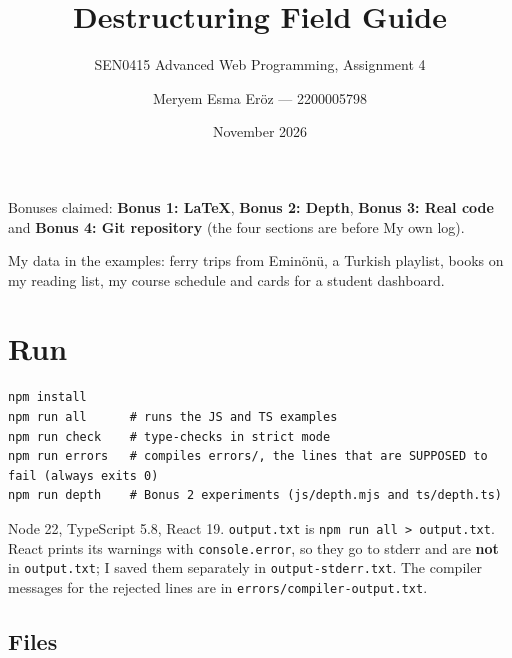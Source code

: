 \documentclass[
  10pt,
]{article}
\title{Destructuring Field Guide}
\subtitle{SEN0415 Advanced Web Programming, Assignment 4}
\author{Meryem Esma Eröz --- 2200005798}
\date{November 2026}
\begin{document}
\maketitle

\renewcommand*\contentsname{Contents}
{
\hypersetup{linkcolor=black}
\setcounter{tocdepth}{2}
\tableofcontents
}
Bonuses claimed: \textbf{Bonus 1: LaTeX}, \textbf{Bonus 2: Depth},
\textbf{Bonus 3: Real code} and \textbf{Bonus 4: Git repository} (the
four sections are before My own log).

My data in the examples: ferry trips from Eminönü, a Turkish playlist,
books on my reading list, my course schedule and cards for a student
dashboard.

\hypertarget{run}{%
\section{Run}\label{run}}

\begin{verbatim}
npm install
npm run all      # runs the JS and TS examples
npm run check    # type-checks in strict mode
npm run errors   # compiles errors/, the lines that are SUPPOSED to fail (always exits 0)
npm run depth    # Bonus 2 experiments (js/depth.mjs and ts/depth.ts)
\end{verbatim}

Node 22, TypeScript 5.8, React 19. \texttt{output.\allowbreak{}txt} is
\texttt{npm\ run\ all\ \textgreater{}\allowbreak{}\ output.\allowbreak{}txt}.
React prints its warnings with \texttt{console.\allowbreak{}error}, so
they go to stderr and are \textbf{not} in
\texttt{output.\allowbreak{}txt}; I saved them separately in
\texttt{output-stderr.\allowbreak{}txt}. The compiler messages for the
rejected lines are in
\texttt{errors/\allowbreak{}compiler-output.\allowbreak{}txt}.

\hypertarget{files}{%
\subsection{Files}\label{files}}
\end{document}
